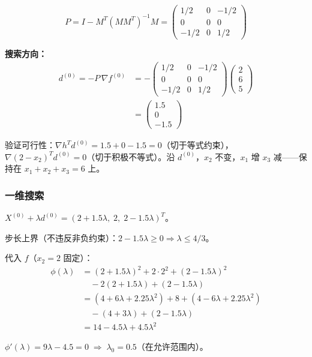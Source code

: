 {\[
P = I - M^T(MM^T)^{-1}M = \begin{pmatrix} 1/2 & 0 & -1/2 \\ 0 & 0 & 0 \\ -1/2 & 0 & 1/2 \end{pmatrix}
\]

\textbf{搜索方向：}
\[
\begin{aligned}
d^{(0)} = -P\,\nabla f^{(0)}
&= -\begin{pmatrix} 1/2 & 0 & -1/2 \\ 0 & 0 & 0 \\ -1/2 & 0 & 1/2 \end{pmatrix}\begin{pmatrix}2\\6\\5\end{pmatrix} \\
&= \begin{pmatrix} 1.5 \\ 0 \\ -1.5 \end{pmatrix}
\end{aligned}
\]

验证可行性：$\nabla h^T d^{(0)} = 1.5+0-1.5 = 0$（切于等式约束），$\nabla(2-x_2)^T d^{(0)} = 0$（切于积极不等式）。沿 $d^{(0)}$，$x_2$ 不变，$x_1$ 增 $x_3$ 减——保持在 $x_1+x_2+x_3=6$ 上。

\subsubsection{一维搜索}

$X^{(0)} + \lambda d^{(0)} = (2+1.5\lambda,\; 2,\; 2-1.5\lambda)^T$。

步长上界（不违反非负约束）：$2-1.5\lambda \ge 0 \Rightarrow \lambda \le 4/3$。

代入 $f$（$x_2=2$ 固定）：
\begin{align*}
\phi(\lambda) &= (2+1.5\lambda)^2 + 2\cdot 2^2 + (2-1.5\lambda)^2 \\
&\quad - 2(2+1.5\lambda) + (2-1.5\lambda) \\
&= (4+6\lambda+2.25\lambda^2) + 8 + (4-6\lambda+2.25\lambda^2) \\
&\quad - (4+3\lambda) + (2-1.5\lambda) \\
&= 14 - 4.5\lambda + 4.5\lambda^2
\end{align*}

$\phi'(\lambda) = 9\lambda - 4.5 = 0 \;\Rightarrow\; \lambda_0 = 0.5$（在允许范围内）。

}
